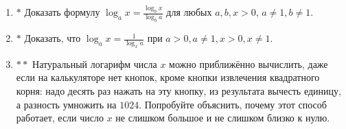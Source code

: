 \begin{enumerate}
    \item $\boldsymbol{*}$ Доказать формулу $\log_a x = \frac{\log_b x}{\log_b a}$ для любых $a, b, x > 0$, $a \neq 1, b \neq 1$.
    \item $\boldsymbol{*}$ Доказать, что $\log_a x = \frac{1}{\log_x a}$ при $a >0, a\neq 1, x>0, x \neq 1$.
    \item $\boldsymbol{**}$ Натуральный логарифм числа $x$ можно приближённо вычислить, даже если на калькуляторе нет кнопок, кроме кнопки извлечения квадратного корня: надо десять раз нажать на эту кнопку, из результата вычесть единицу, а разность умножить на $1024$. Попробуйте объяснить, почему этот способ работает, если число $x$ не слишком большое и не слишком близко к нулю.
    
\end{enumerate}
